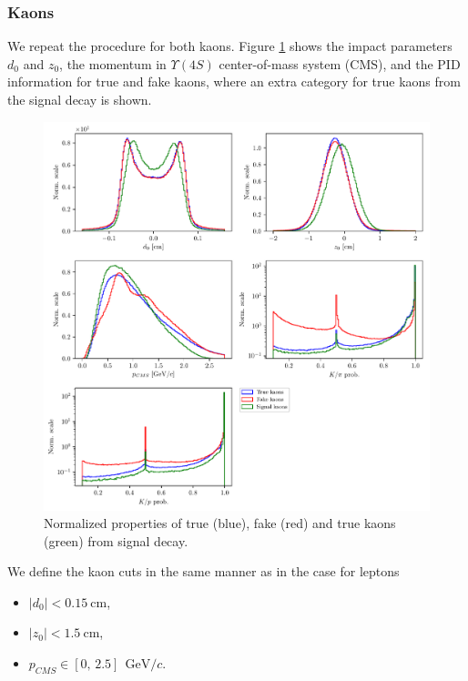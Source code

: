 \documentclass[headings=standardclasses,headings=big,oneside,a4paper,openany,12pt]{scrbook}
\newcommand {\e}[1]{\mathrm{~#1}}
\begin{document}
\subsubsection{Kaons}

We repeat the procedure for both kaons. Figure \ref{fig:Kvars} shows the impact parameters $d_0$ and $z_0$, the momentum in  $\Upsilon(4S)$ center-of-mass system (CMS), and the PID information for true and fake kaons, where an extra category for true kaons from the signal decay is shown.

\begin{figure}[H]
\centering
\includegraphics[width=\linewidth]{fig/FSP_kaon_vars}
\captionsetup{width=.8\linewidth}
\caption{Normalized properties of true (blue), fake (red) and true kaons (green) from signal decay.}
\label{fig:Kvars}
\end{figure}

We define the kaon cuts in the same manner as in the case for leptons
\begin{itemize}
\item $\vert d_0 \vert < 0.15\e{cm}$,
\item $\vert z_0 \vert < 1.5\e{cm}$,
\item $p_{CMS} \in [0,\,2.5]~\e{GeV}/c$.
\end{itemize}
\end{document}

